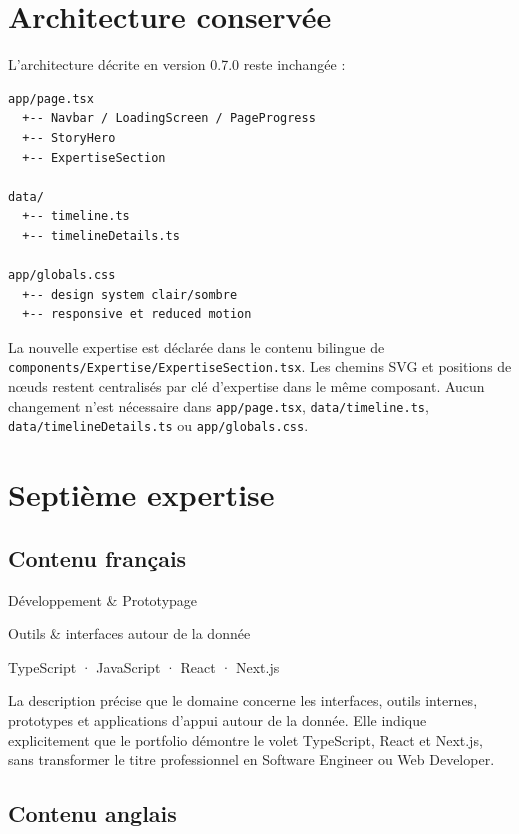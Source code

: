 \documentclass[11pt,a4paper]{article}
\newcommand{\tech}[1]{\texttt{#1}}
\begin{document}
\section{Architecture conservée}

L'architecture décrite en version 0.7.0 reste inchangée :

\begin{verbatim}
app/page.tsx
  +-- Navbar / LoadingScreen / PageProgress
  +-- StoryHero
  +-- ExpertiseSection

data/
  +-- timeline.ts
  +-- timelineDetails.ts

app/globals.css
  +-- design system clair/sombre
  +-- responsive et reduced motion
\end{verbatim}

La nouvelle expertise est déclarée dans le contenu bilingue de
\tech{components/Expertise/ExpertiseSection.tsx}. Les chemins SVG et positions de nœuds
restent centralisés par clé d'expertise dans le même composant. Aucun changement n'est
nécessaire dans \tech{app/page.tsx}, \tech{data/timeline.ts},
\tech{data/timelineDetails.ts} ou \tech{app/globals.css}.

\section{Septième expertise}

\subsection{Contenu français}

\begin{description}[leftmargin=3.3cm,style=nextline]
  \item[Titre] Développement \& Prototypage
  \item[Sous-titre] Outils \& interfaces autour de la donnée
  \item[Sélection compacte] TypeScript · JavaScript · React · Next.js
\end{description}

La description précise que le domaine concerne les interfaces, outils internes, prototypes et
applications d'appui autour de la donnée. Elle indique explicitement que le portfolio démontre
le volet TypeScript, React et Next.js, sans transformer le titre professionnel en Software
Engineer ou Web Developer.

\subsection{Contenu anglais}
\end{document}
